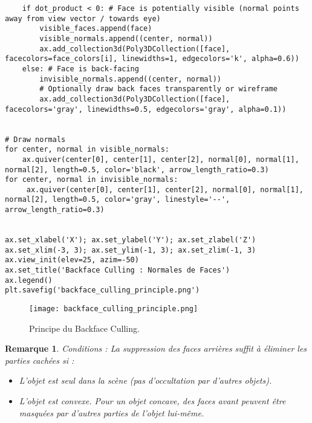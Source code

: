 \documentclass{article}
\newtheorem{remark}{Remarque}
\begin{document}
{\begin{verbatim}
    if dot_product < 0: # Face is potentially visible (normal points away from view vector / towards eye)
        visible_faces.append(face)
        visible_normals.append((center, normal))
        ax.add_collection3d(Poly3DCollection([face], facecolors=face_colors[i], linewidths=1, edgecolors='k', alpha=0.6))
    else: # Face is back-facing
        invisible_normals.append((center, normal))
        # Optionally draw back faces transparently or wireframe
        ax.add_collection3d(Poly3DCollection([face], facecolors='gray', linewidths=0.5, edgecolors='gray', alpha=0.1))


# Draw normals
for center, normal in visible_normals:
    ax.quiver(center[0], center[1], center[2], normal[0], normal[1], normal[2], length=0.5, color='black', arrow_length_ratio=0.3)
for center, normal in invisible_normals:
     ax.quiver(center[0], center[1], center[2], normal[0], normal[1], normal[2], length=0.5, color='gray', linestyle='--', arrow_length_ratio=0.3)


ax.set_xlabel('X'); ax.set_ylabel('Y'); ax.set_zlabel('Z')
ax.set_xlim(-3, 3); ax.set_ylim(-1, 3); ax.set_zlim(-1, 3)
ax.view_init(elev=25, azim=-50)
ax.set_title('Backface Culling : Normales de Faces')
ax.legend()
plt.savefig('backface_culling_principle.png')
\end{verbatim}

\begin{figure}[H]
\centering
\texttt{[image: backface\_culling\_principle.png]}
\caption{Principe du Backface Culling.}
\label{fig:backface_culling_principle}
\end{figure}

\begin{remark}
Conditions : La suppression des faces arrières suffit à éliminer les parties cachées si :
\begin{itemize}
    \item L'objet est seul dans la scène (pas d'occultation par d'autres objets).
    \item L'objet est convexe. Pour un objet concave, des faces avant peuvent être masquées par d'autres parties de l'objet lui-même.
\end{itemize}
\end{remark}

}
\end{document}
